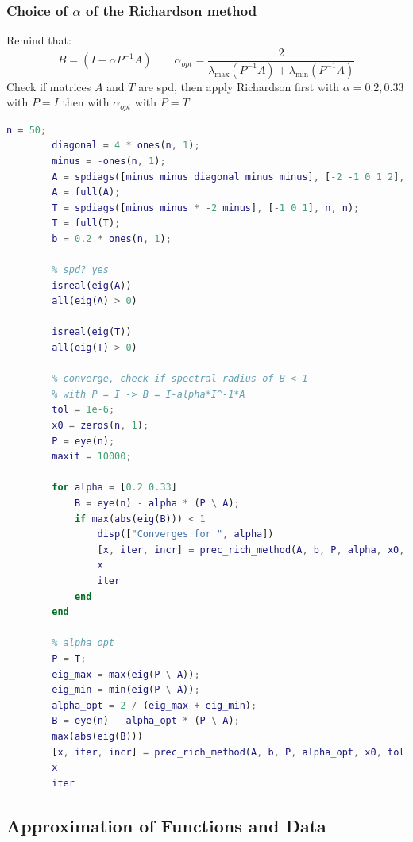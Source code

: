     \subsubsection{Choice of $\alpha$ of the Richardson method}
        Remind that:
        $$
        B=(I-\alpha P^{-1}A)
        \qquad
        \alpha_{opt}=\frac{
            2
        }{
            \lambda_{\max}(P^{-1}A)+\lambda_{\min}(P^{-1}A)
        }
        $$
        Check if matrices $A$ and $T$ are spd, then apply Richardson first with $\alpha=0.2,0.33$ with $P=I$ then with $\alpha_{opt}$ with $P=T$
        \begin{lstlisting}[language=Matlab, escapeinside=`', gobble=8]
        n = 50;
        diagonal = 4 * ones(n, 1);
        minus = -ones(n, 1);
        A = spdiags([minus minus diagonal minus minus], [-2 -1 0 1 2], n, n);
        A = full(A);
        T = spdiags([minus minus * -2 minus], [-1 0 1], n, n);
        T = full(T);
        b = 0.2 * ones(n, 1);
        
        % spd? yes
        isreal(eig(A))
        all(eig(A) > 0)
        
        isreal(eig(T))
        all(eig(T) > 0)
        
        % converge, check if spectral radius of B < 1
        % with P = I -> B = I-alpha*I^-1*A
        tol = 1e-6;
        x0 = zeros(n, 1);
        P = eye(n);
        maxit = 10000;
        
        for alpha = [0.2 0.33]
            B = eye(n) - alpha * (P \ A);
            if max(abs(eig(B))) < 1
                disp(["Converges for ", alpha])
                [x, iter, incr] = prec_rich_method(A, b, P, alpha, x0, tol, maxit);
                x
                iter
            end
        end
        
        % alpha_opt
        P = T;
        eig_max = max(eig(P \ A));
        eig_min = min(eig(P \ A));
        alpha_opt = 2 / (eig_max + eig_min);
        B = eye(n) - alpha_opt * (P \ A);
        max(abs(eig(B)))
        [x, iter, incr] = prec_rich_method(A, b, P, alpha_opt, x0, tol, maxit);
        x
        iter
        \end{lstlisting}
    
\subsection{Approximation of Functions and Data}
